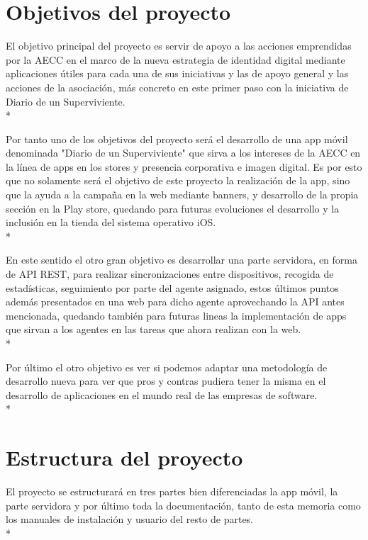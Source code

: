 \documentclass[../pfc.tex]{subfiles}
\begin{document}
\section{Objetivos del proyecto}
El objetivo principal del proyecto es servir de apoyo a las acciones emprendidas por la AECC en el marco de la nueva estrategia de identidad digital mediante aplicaciones útiles para cada una de sus iniciativas y las de apoyo general y las acciones de la asociación, más concreto en este primer paso con la iniciativa de Diario de un Superviviente.\\*

Por tanto uno de los objetivos del proyecto será el desarrollo de una app móvil denominada "Diario de un Superviviente" que sirva a los intereses de la AECC en la línea de apps en los stores y presencia corporativa e imagen digital. Es por esto que no solamente será el objetivo de este proyecto la realización de la app, sino que la ayuda a la campaña en la web mediante banners, y desarrollo de la propia sección en la Play store, quedando para futuras evoluciones el desarrollo y la inclusión en la tienda del sistema operativo iOS.\\*

En este sentido el otro gran objetivo es desarrollar una parte servidora, en forma de API REST, para realizar sincronizaciones entre dispositivos, recogida de estadísticas, seguimiento por parte del agente asignado, estos últimos puntos además presentados en una web para dicho agente aprovechando la API antes mencionada, quedando también para futuras lineas la implementación de apps que sirvan a los agentes en las tareas que ahora realizan con la web.\\*

Por último el otro objetivo es ver si podemos adaptar una metodología de desarrollo nueva para ver que pros y contras pudiera tener la misma en el desarrollo de aplicaciones en el mundo real de las empresas de software.\\*

\section{Estructura del proyecto}

El proyecto se estructurará en tres partes bien diferenciadas la app móvil, la parte servidora y por último toda la documentación, tanto de esta memoria como los manuales de instalación y usuario del resto de partes.\\* 
\end{document}
